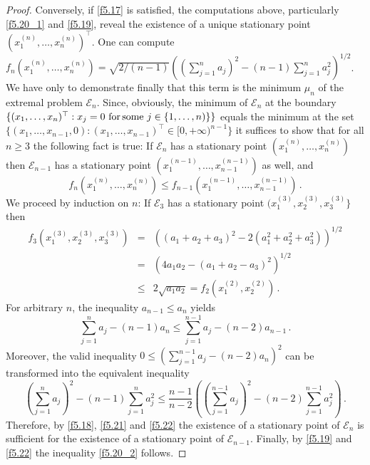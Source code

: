 \documentclass{amsart}
\begin{document}
\begin{proof}
Conversely, if \eqref{f5.17} is satisfied, the computations above, particularly \eqref{f5.20_1} and \eqref{f5.19}, reveal the existence of a unique stationary point $(x_1^{(n)},\ldots,x_n^{(n)})^\top$. One can compute $f_n(x_1^{(n)},\ldots,x_n^{(n)}) = \sqrt{2/(n-1)} \left((\sum_{j=1}^n a_j)^2 - (n-1) \sum_{j=1}^n a_j^2 \right)^{1/2}$. We have only to demonstrate finally that this term is the minimum $\mu_n$ of the extremal problem ${\mathcal E}_n$. Since, obviously, the minimum of ${\mathcal E}_n$ at the boundary $\{ (x_1,\ldots,x_n)^\top : x_j=0 \,\, {\rm for} \, {\rm some} \,\, j \in \{1,\ldots,n)\}\}$ equals the minimum at the set $\{ (x_1,\ldots,x_{n-1},0): (x_1,\ldots,x_{n-1})^\top \in [0,+\infty)^{n-1} \}$ it suffices to show that for all $n \geq 3$ the following fact is true: If ${\mathcal E}_n$ has a stationary point $(x_1^{(n)}, \ldots , x_n^{(n)} )$ then ${\mathcal E}_{n-1}$ has a stationary point $(x_1^{(n-1)}, \ldots , x_{n-1}^{(n-1)} )$ as well, and 
\begin{equation}  \label{f5.20_2}
    f_n(x_1^{(n)},\ldots,x_n^{(n)}) \leq f_{n-1}(x_1^{(n-1)},\ldots,x_{n-1}^{(n-1)}) \, .
\end{equation}    
We proceed by induction on $n$: If ${\mathcal E}_3$ has a stationary point $(x_1^{(3)},x_2^{(3)},x_3^{(3)} \}$ then 
\begin{eqnarray*}
          f_3(x_1^{(3)},x_2^{(3)},x_3^{(3)}) & = & ((a_1+a_2+a_3)^2 -2(a_1^2+a_2^2+a_3^2))^{1/2} \\
                                                               & = &  (4a_1a_2 - (a_1+a_2-a_3)^2)^{1/2} \\
                                                            & \leq & 2 \sqrt{a_1a_2} = f_2(x_1^{(2)},x_2^{(2)}) \, .
\end{eqnarray*}
For arbitrary $n$, the inequality $a_{n-1} \leq a_n$ yields
\begin{equation} \label{f5.21}
      \sum_{j=1}^n a_j - (n-1) a_n \leq \sum_{j=1}^{n-1} a_j - (n-2) a_{n-1} \, .
\end{equation}
Moreover, the valid inequality $0 \leq (\sum_{j=1}^{n-1} a_j - (n-2) a_n)^2$ can be transformed into the equivalent inequality
\begin{equation}    \label{f5.22}
      ( \sum_{j=1}^n a_j )^2 - (n-1) \sum_{j=1}^n a_j^2 \leq \frac{n-1}{n-2} \left(  (\sum_{j=1}^{n-1} a_j)^2 - (n-2) \sum_{j=1}^{n-1} a_j^2\right) \, .
\end{equation}
Therefore, by \eqref{f5.18}, \eqref{f5.21} and \eqref{f5.22} the existence of a stationary point of ${\mathcal E}_n$ is sufficient for the existence of a stationary point of ${\mathcal E}_{n-1}$. Finally, by \eqref{f5.19} and \eqref{f5.22} the inequality \eqref{f5.20_2} follows. 
\end{proof}   
\end{document}
